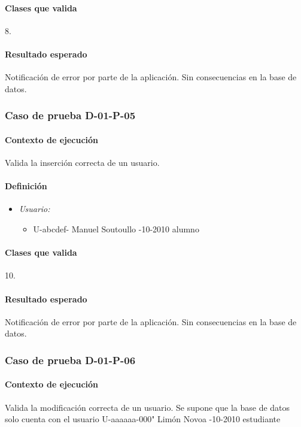 \documentclass[10pt,a4paper]{article}
\begin{document}
				\paragraph{Clases que valida} 8.
				\paragraph{Resultado esperado} Notificación de error por parte de la aplicación. Sin consecuencias en la base de datos.
			\subsubsection{Caso de prueba D-01-P-05}
			\paragraph{Contexto de ejecución} Valida la inserción correcta de un usuario.
				\paragraph{Definición}
				\begin{itemize}
					\item \textit{Usuario:}
					\begin{itemize}
						\item \textbar U-abcdef- \textbar Manuel \textbar Soutoullo -10-2010 \textbar alumno \textbar
					\end{itemize}
				\end{itemize}
				\paragraph{Clases que valida} 10.
				\paragraph{Resultado esperado} Notificación de error por parte de la aplicación. Sin consecuencias en la base de datos.
			\subsubsection{Caso de prueba D-01-P-06}
			\paragraph{Contexto de ejecución} Valida la modificación correcta de un usuario. Se supone que la base de datos solo cuenta con el usuario \textbar U-aaaaaa-000" \textbar Limón Novoa -10-2010 \textbar estudiante \textbar
\end{document}
